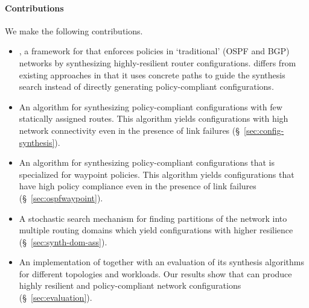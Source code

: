 \paragraph{Contributions} We make the following contributions.
\begin{itemize}	
    \item \name, a framework for
	that enforces policies in `traditional' (OSPF and BGP) networks
	by synthesizing highly-resilient router configurations. 		
	\name differs from existing approaches in that it uses concrete
	paths to guide the synthesis search instead of directly generating policy-compliant
	configurations.

	\item An algorithm for synthesizing policy-compliant
          configurations with few statically assigned routes. This
          algorithm yields configurations with high network
          connectivity even in the presence of link failures
          (\S~\ref{sec:config-synthesis}).

	\item An algorithm for synthesizing policy-compliant 		
		 configurations that is specialized for waypoint policies. 
		 This algorithm yields configurations that have
		 high policy compliance even in the presence of link failures (\S~\ref{sec:ospfwaypoint}). 
	
	\item A stochastic search mechanism for finding 
		partitions of the network into multiple routing domains which
		yield configurations with higher resilience (\S~\ref{sec:synth-dom-ass}).
	
	\item An implementation of \name
	together with an evaluation of its synthesis algorithms
	 for different topologies and workloads. 
	 Our results show that \name can produce highly resilient and policy-compliant
	 network configurations (\S~\ref{sec:evaluation}). 
\end{itemize}
